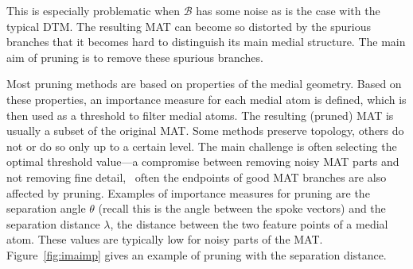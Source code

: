 This is especially problematic when $\mathcal{B}$ has some noise as is the case with the typical DTM.
The resulting MAT can become so distorted by the spurious branches that it becomes hard to distinguish its main medial structure.
The main aim of pruning is to remove these spurious branches.

Most pruning methods are based on properties of the medial geometry. 
Based on these properties, an importance measure for each medial atom is defined, which is then used as a threshold to filter medial atoms. 
The resulting (pruned) MAT is usually a subset of the original MAT. 
Some methods preserve topology, others do not or do so only up to a certain level. 
The main challenge is often selecting the optimal threshold value---a compromise between removing noisy MAT parts and not removing fine detail, \ie\ often the endpoints of good MAT branches are also affected by pruning.
Examples of importance measures for pruning are the separation angle $\theta$ (recall this is the angle between the spoke vectors) and the separation distance $\lambda$, \ie the distance between the two feature points of a medial atom. 
These values are typically low for noisy parts of the MAT.
Figure~\ref{fig:imaimp} gives an example of pruning with the separation distance.
